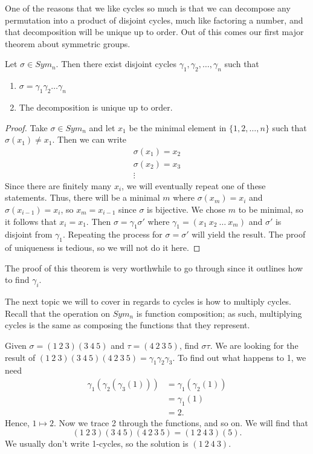 One of the reasons that we like cycles so much is that we can decompose any permutation into a product of disjoint cycles, much like factoring a number, and that decomposition will be unique up to order. Out of this comes our first major theorem about symmetric groups.

\begin{theorem}{}
    Let $\sigma\in Sym_{n}$. Then there exist disjoint cycles $\gamma_{1},\gamma_{2},\dots,\gamma_{n}$ such that
    \begin{enumerate}
        \item $\sigma=\gamma_{1}\gamma_{2}\dots\gamma_{n}$
        \item The decomposition is unique up to order.
    \end{enumerate}
\end{theorem}
\begin{proof}
    Take $\sigma\in Sym_{n}$ and let $x_{1}$ be the minimal element in $\{1,2,\dots,n\}$ such that $\sigma(x_{1})\neq x_{1}$. Then we can write
    \begin{gather*}
        \sigma(x_{1})=x_{2}\\
        \sigma(x_{2})=x_{3}\\
        \vdots
    \end{gather*}
    Since there are finitely many $x_{i}$, we will eventually repeat one of these statements. Thus, there will be a minimal $m$ where $\sigma(x_{m})=x_{i}$ and $\sigma(x_{i-1})=x_{i}$, so $x_{m}=x_{i-1}$ since $\sigma$ is bijective.
    We chose $m$ to be minimal, so it follows that $x_{i}=x_{1}$. Then $\sigma=\gamma_{1}\sigma'$ where
    $\gamma_{1}=(x_{1}\ x_{2}\ \dots\ x_{m})$ and $\sigma'$ is disjoint from $\gamma_{1}$. Repeating the process for $\sigma=\sigma'$ will yield the result. The proof of uniqueness is tedious, so we will not do it here.
\end{proof}

The proof of this theorem is very worthwhile to go through since it outlines how to find $\gamma_{i}$.

The next topic we will to cover in regards to cycles is how to multiply cycles. Recall that the operation on $Sym_{n}$ is function composition; as such, multiplying cycles is the same as composing the functions that they represent.
\begin{example}{Given $\sigma=(1\ 2\ 3)(3\ 4\ 5)$ and $\tau=(4\ 2\ 3\ 5)$, find $\sigma\tau$.}
    We are looking for the result of $(1\ 2\ 3)(3\ 4\ 5)(4\ 2\ 3\ 5)=\gamma_{1}\gamma_{2}\gamma_{3}$. To find out what happens to 1, we need
    \begin{align*}
        \gamma_{1}(\gamma_{2}(\gamma_{3}(1))) &= \gamma_{1}(\gamma_{2}(1))\\
        &= \gamma_{1}(1)\\
        &= 2.
    \end{align*}
    Hence, $1\mapsto2$. Now we trace 2 through the functions, and so on. We will find that
    \[
        (1\ 2\ 3)(3\ 4\ 5)(4\ 2\ 3\ 5)=(1\ 2\ 4\ 3)(5).
    \]
    We usually don't write 1-cycles, so the solution is $(1\ 2\ 4\ 3)$.
\end{example}

